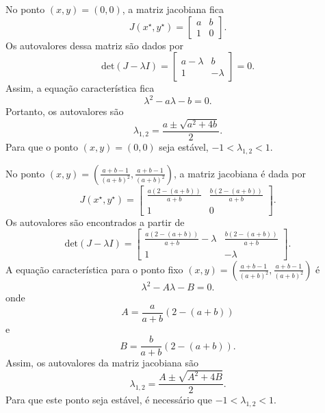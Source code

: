 \documentclass[brazilian, 12pt, a4paper, final]{article}
\begin{document}
\begin{multicols*}{2}
No ponto $(x,y)=(0,0)$, a matriz jacobiana fica
\begin{equation}
	J(x^{\star},y^{\star})= 
	\begin{bmatrix}
		a & b \\
	 	1 & 0            
	\end{bmatrix}.
\end{equation}
Os autovalores dessa matriz são dados por
\begin{equation}
	\mathrm{det}(J-\lambda I)= 
	\begin{bmatrix}
		a-\lambda & b \\
	 	1 & -\lambda            
	\end{bmatrix}=0.
\end{equation}
Assim, a equação característica fica
\begin{equation}
	\lambda^2-a\lambda-b=0.
\end{equation}
Portanto, os autovalores são 
\begin{equation} \label{eq:auto1}
	\lambda_{1,2}=\frac{a\pm\sqrt{a^2+4b}}{2}. 
\end{equation}
Para que o ponto $(x,y)=(0,0)$ seja estável, $-1<\lambda_{1,2}<1$.

No ponto $(x,y)=\left(\frac{a+b-1}{(a+b)^2},\frac{a+b-1}{(a+b)^2}\right)$, a matriz jacobiana é dada por
\begin{equation}
	J(x^{\star},y^{\star})= 
	\begin{bmatrix}
		\frac{a(2-(a+b))}{a+b} & \frac{b(2-(a+b))}{a+b} \\
	 	1 & 0            
	\end{bmatrix}.
\end{equation}
Os autovalores são encontrados a partir de 
\begin{equation}
	\mathrm{det}(J-\lambda I)= 
	\begin{bmatrix}
		\frac{a(2-(a+b))}{a+b}-\lambda & \frac{b(2-(a+b))}{a+b} \\
	 	1 & -\lambda
	\end{bmatrix}.
\end{equation}
A equação característica para o ponto fixo $(x,y)=\left(\frac{a+b-1}{(a+b)^2},\frac{a+b-1}{(a+b)^2}\right)$ é
\begin{equation}
	\lambda^2-A\lambda-B=0.
\end{equation}
onde \begin{equation}
A=\frac{a}{a+b}(2-(a+b))
\end{equation} e \begin{equation}
B=\frac{b}{a+b}(2-(a+b)).
\end{equation}
Assim, os autovalores da matriz jacobiana são
\begin{equation} \label{eq:auto2}
	\lambda_{1,2}=\frac{A\pm\sqrt{A^2+4B}}{2}.
\end{equation}
Para que este ponto seja estável, é necessário que $-1<\lambda_{1,2}<1$.


\end{multicols*}
\end{document}
